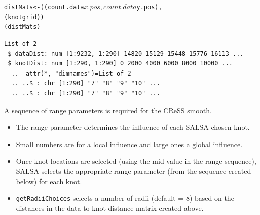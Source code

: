 \begin{frame}[fragile]
\begin{knitrout}\footnotesize
{}\color{fgcolor}\begin{kframe}
\begin{alltt}
distMats <- ((count.data$x.pos, count.data$y.pos), 
               (knotgrid))
(distMats)
\end{alltt}
\begin{verbatim}
List of 2
 $ dataDist: num [1:9232, 1:290] 14820 15129 15448 15776 16113 ...
 $ knotDist: num [1:290, 1:290] 0 2000 4000 6000 8000 10000 ...
  ..- attr(*, "dimnames")=List of 2
  .. ..$ : chr [1:290] "7" "8" "9" "10" ...
  .. ..$ : chr [1:290] "7" "8" "9" "10" ...
\end{verbatim}
\end{kframe}
\end{knitrout}

\noindent A sequence of range parameters is required for the CReSS smooth.  
\begin{itemize}
\item The range parameter determines the influence of each SALSA chosen knot.  
\item Small numbers are for a local influence and large ones a global influence.
\item Once knot locations are selected (using the mid value in the range sequence), SALSA selects the appropriate range parameter (from the sequence created below) for each knot.
\item {\tt getRadiiChoices} selects a number of radii (default = 8) based on the distances in the data to knot distance matrix created above.
\end{itemize}
\begin{knitrout}\footnotesize
{}\color{fgcolor}
\end{knitrout}
\end{frame}


